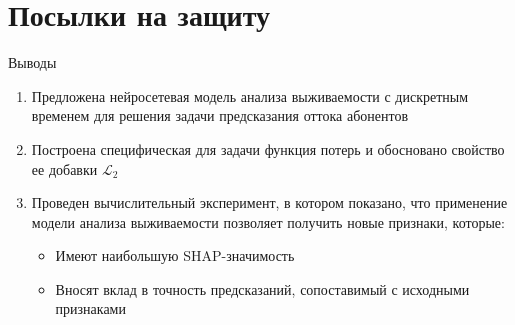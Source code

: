 \documentclass[10pt,pdf,hyperref={unicode}]{beamer}
\begin{document}
\section{Посылки на защиту}
\begin{frame}{Выводы}
	\justifying
	\begin{minipage}{0.85\textwidth} %
		\begin{enumerate}
			\justifying
			\item Предложена нейросетевая модель анализа выживаемости с дискретным временем для решения задачи предсказания оттока абонентов 
			
			\item Построена специфическая для задачи функция потерь и обосновано свойство ее добавки $\mathcal{L}_2$
			
			\item Проведен вычислительный эксперимент, в котором показано, что применение модели анализа выживаемости позволяет получить новые признаки, которые: 
			\begin{itemize}
				\item Имеют наибольшую SHAP-значимость
				\item Вносят вклад в точность предсказаний, сопоставимый с исходными признаками
			\end{itemize}
		\end{enumerate}
	\end{minipage}
\end{frame}

\end{document}
